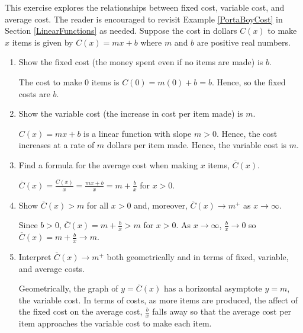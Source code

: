 \documentclass{ximera}
\begin{document}
\begin{problem}\label{averagevariablecostexercise}
This exercise explores the relationships between fixed cost, variable cost, and average cost.  The reader is encouraged to revisit Example \ref{PortaBoyCost} in Section \ref{LinearFunctions} as needed.  Suppose the cost in dollars $C(x)$ to make $x$ items is given by $C(x) = mx + b$ where $m$ and $b$ are positive real numbers.

\begin{enumerate}

\item  Show the fixed cost (the money spent even if no items are made) is $b$.

\begin{solution}
    The cost to make $0$ items is $C(0) = m(0)+b = b$.  Hence,  so the fixed costs are $b$.
\end{solution}

\item  Show the variable cost (the increase in cost per item made) is $m$.

\begin{solution}
    $C(x) = mx+b$ is a linear function with slope $m>0$.  Hence, the cost increases at a rate of $m$ dollars per item made.  Hence, the variable cost is $m$.
\end{solution}

\item  Find a formula for the average cost when making $x$ items, $\overline{C}(x)$.

\begin{solution}
    $\overline{C}(x) = \frac{C(x)}{x} = \frac{mx+b}{x} = m + \frac{b}{x}$ for $x > 0$.
\end{solution}

\item  Show $\overline{C}(x) > m$ for all $x>0$ and, moreover,   $\overline{C}(x)  \rightarrow m^{+}$ as $x \rightarrow \infty$.

\begin{solution}
    Since $b>0$,  $\overline{C}(x)  = m + \frac{b}{x} > m$ for $x > 0$. As $x \rightarrow \infty$, $\frac{b}{x} \rightarrow 0$ so $\overline{C}(x)  = m + \frac{b}{x} \rightarrow m$.
\end{solution}

\item  Interpret $\overline{C}(x)  \rightarrow m^{+}$ both geometrically and in terms of fixed, variable, and average costs.

\begin{solution}
    Geometrically, the graph of $y = \overline{C}(x)$ has a horizontal asymptote $y = m$, the variable cost.  In terms of costs, as more items are produced, the affect of the fixed cost on the average cost, $\frac{b}{x}$ falls away so that the average cost per item approaches the variable cost to make each item.
\end{solution}

\end{enumerate}
\end{problem}
\end{document}
